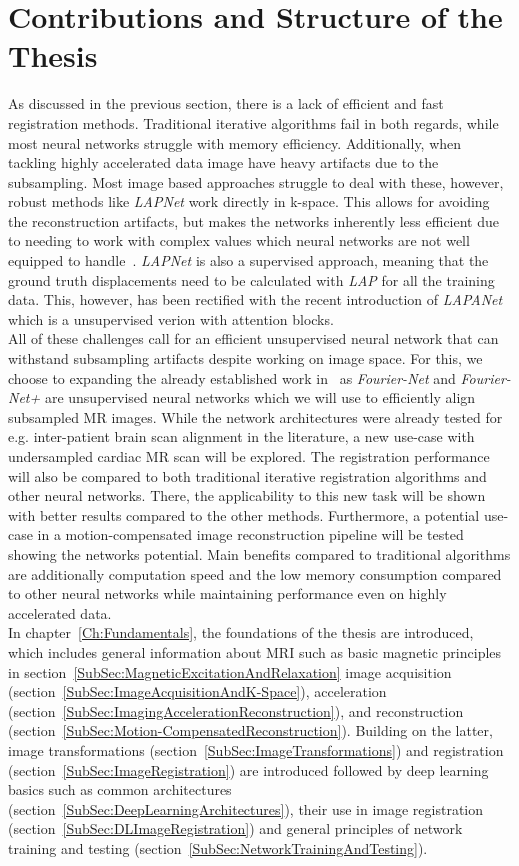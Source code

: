 \section{Contributions and Structure of the Thesis} \label{Sec:ContributionsAndStructure}
As discussed in the previous section, there is a lack of efficient and fast registration methods. Traditional iterative algorithms fail in both regards, while most neural networks struggle with memory efficiency. Additionally, when tackling highly accelerated data image have heavy artifacts due to the subsampling. Most image based approaches struggle to deal with these, however, robust methods like \emph{LAPNet} work directly in k-space. This allows for avoiding the reconstruction artifacts, but makes the networks inherently less efficient due to needing to work with complex values which neural networks are not well equipped to handle~\cite{Trabelsi2017}. \emph{LAPNet} is also a supervised approach, meaning that the ground truth displacements need to be calculated with \emph{LAP} for all the training data. This, however, has been rectified with the recent introduction of \emph{LAPANet}~\cite{LAPANet} which is a unsupervised verion with attention blocks.\\
All of these challenges call for an efficient unsupervised neural network that can withstand subsampling artifacts despite working on image space. For this, we choose to expanding the already established work in~\cite{Fourier-Net,Fourier-Net+} as \emph{Fourier-Net} and \emph{Fourier-Net+} are unsupervised neural networks which we will use to efficiently align subsampled MR images. While the network architectures were already tested for e.g. inter-patient brain scan alignment in the literature, a new use-case with undersampled cardiac MR scan will be explored. The registration performance will also be compared to both traditional iterative registration algorithms and other neural networks. There, the applicability to this new task will be shown with better results compared to the other methods. Furthermore, a potential use-case in a motion-compensated image reconstruction pipeline will be tested showing the networks potential. Main benefits compared to traditional algorithms are additionally computation speed and the low memory consumption compared to other neural networks while maintaining performance even on highly accelerated data.\\
In chapter~\ref{Ch:Fundamentals}, the foundations of the thesis are introduced, which includes general information about MRI such as basic magnetic principles in section~\ref{SubSec:MagneticExcitationAndRelaxation} image acquisition (section~\ref{SubSec:ImageAcquisitionAndK-Space}), acceleration (section~\ref{SubSec:ImagingAccelerationReconstruction}), and reconstruction (section~\ref{SubSec:Motion-CompensatedReconstruction}). Building on the latter, image transformations (section~\ref{SubSec:ImageTransformations}) and registration (section~\ref{SubSec:ImageRegistration}) are introduced followed by deep learning basics such as common architectures (section~\ref{SubSec:DeepLearningArchitectures}), their use in image registration (section~\ref{SubSec:DLImageRegistration}) and general principles of network training and testing (section~\ref{SubSec:NetworkTrainingAndTesting}).\\
